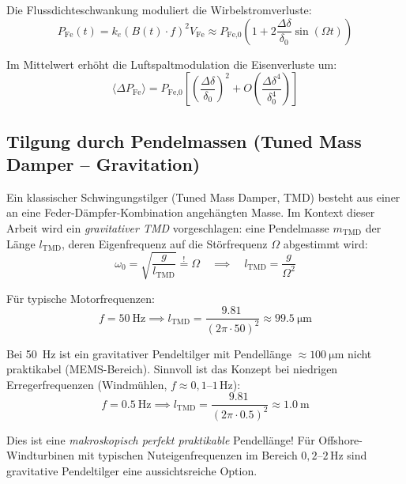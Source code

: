 ﻿\documentclass[12pt, a4paper]{report}
\theoremstyle{definition}
\theoremstyle{remark}
\begin{document}
Die Flussdichteschwankung moduliert die Wirbelstromverluste:
\begin{equation}
  P_{\text{Fe}}(t) = k_e (B(t)\cdot f)^2 V_{\text{Fe}}
  \approx P_{\text{Fe,0}}\left(1 + 2\frac{\Delta\delta}{\delta_0}\sin(\Omega t)\right)
  \label{eq:pfe_modulation}
\end{equation}

Im Mittelwert erhöht die Luftspaltmodulation die Eisenverluste um:
\begin{equation}
  \langle \Delta P_{\text{Fe}} \rangle = P_{\text{Fe,0}}
  \left[\left(\frac{\Delta\delta}{\delta_0}\right)^2
  + O\!\left(\frac{\Delta\delta^4}{\delta_0^4}\right)\right]
  \label{eq:delta_pfe}
\end{equation}

\subsection{Tilgung durch Pendelmassen (Tuned Mass Damper -- Gravitation)}

Ein klassischer Schwingungstilger (Tuned Mass Damper, TMD) besteht aus einer
an eine Feder-Dämpfer-Kombination angehängten Masse. Im Kontext dieser Arbeit
wird ein \emph{gravitativer TMD} vorgeschlagen: eine Pendelmasse $m_\text{TMD}$
der Länge $l_\text{TMD}$, deren Eigenfrequenz auf die Störfrequenz $\Omega$
abgestimmt wird:
\begin{equation}
  \omega_0 = \sqrt{\frac{g}{l_\text{TMD}}} \stackrel{!}{=} \Omega
  \quad\implies\quad
  l_\text{TMD} = \frac{g}{\Omega^2}
  \label{eq:tmd_abstimmung}
\end{equation}

Für typische Motorfrequenzen:
\begin{equation}
  f = \SI{50}{\hertz} \implies l_\text{TMD} = \frac{\SI{9.81}{}}{(2\pi\cdot50)^2}
  \approx \SI{99.5}{\micro\metre}
  \label{eq:tmd_50hz}
\end{equation}

Bei \SI{50}{\hertz} ist ein gravitativer Pendeltilger mit Pendellänge $\approx
\SI{100}{\micro\metre}$ nicht praktikabel (MEMS-Bereich). Sinnvoll ist das Konzept bei
niedrigen Erregerfrequenzen (Windmühlen, $f \approx 0{,}1$--$1\,\si{\hertz}$):
\begin{equation}
  f = \SI{0.5}{\hertz} \implies l_\text{TMD} = \frac{\SI{9.81}{}}{(2\pi\cdot 0.5)^2}
  \approx \SI{1.0}{\metre}
  \label{eq:tmd_0p5hz}
\end{equation}

Dies ist eine \emph{makroskopisch perfekt praktikable} Pendellänge! Für Offshore-
Windturbinen mit typischen Nuteigenfrequenzen im Bereich $0{,}2$--$2\,\si{\hertz}$
sind gravitative Pendeltilger eine aussichtsreiche Option.
\end{document}

